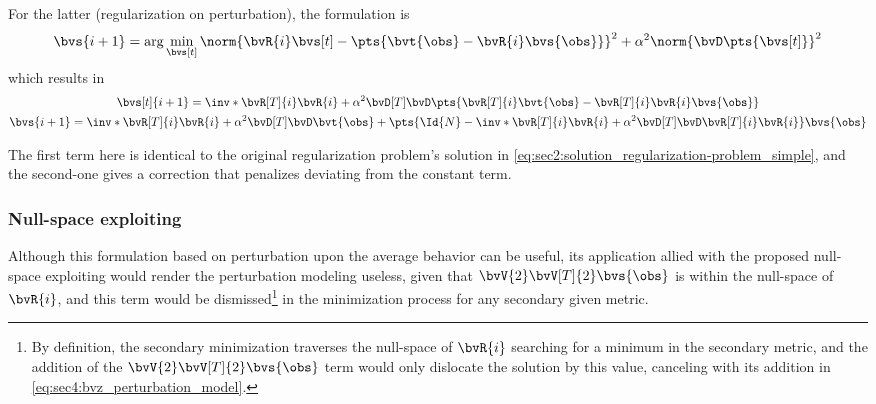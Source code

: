 {For the latter (regularization on perturbation), the formulation is
\begin{equation}
	\bvs{i+1} = \arg\min_{\bvs[t]} \norm{\bvR{i} \bvs[t] - \pts{\bvt{\obs} - \bvR{i} \bvs{\obs}}}^2 + \alpha^2\norm{\bvD \pts{\bvs[t]}}^2 
	\label{eq:sec3:minimization_perturbation-with-regularization_formulation}
\end{equation}
which results in
\begin{subequations}
	\begin{gather}
		\bvs[t]{i+1} = \inv*{\bvR[T]{i} \bvR{i} + \alpha^2 \bvD[T] \bvD} \pts{\bvR[T]{i} \bvt{\obs} - \bvR[T]{i} \bvR{i} \bvs{\obs}} \\
		\bvs{i+1} = \inv*{\bvR[T]{i} \bvR{i} + \alpha^2 \bvD[T] \bvD} \bvt{\obs} + \pts{\Id{N} - \inv*{\bvR[T]{i} \bvR{i} + \alpha^2 \bvD[T] \bvD} \bvR[T]{i} \bvR{i}} \bvs{\obs}
	\end{gather}
\end{subequations}

The first term here is identical to the original regularization problem's solution in \cref{eq:sec2:solution_regularization-problem_simple}, and the second-one gives a correction that penalizes deviating from the constant term.

\subsubsection{Null-space exploiting}

Although this formulation based on perturbation upon the average behavior can be useful, its application allied with the proposed null-space exploiting would render the perturbation modeling useless, given that $\bvV{2}\bvV[T]{2} \bvs{\obs}$ is within the null-space of $\bvR{i}$, and this term would be dismissed\footnote{By definition, the secondary minimization traverses the null-space of $\bvR{i}$ searching for a minimum in the secondary metric, and the addition of the $\bvV{2}\bvV[T]{2} \bvs{\obs}$ term would only dislocate the solution by this value, canceling with its addition in \cref{eq:sec4:bvz_perturbation_model}.} in the minimization process for any secondary given metric.

}
